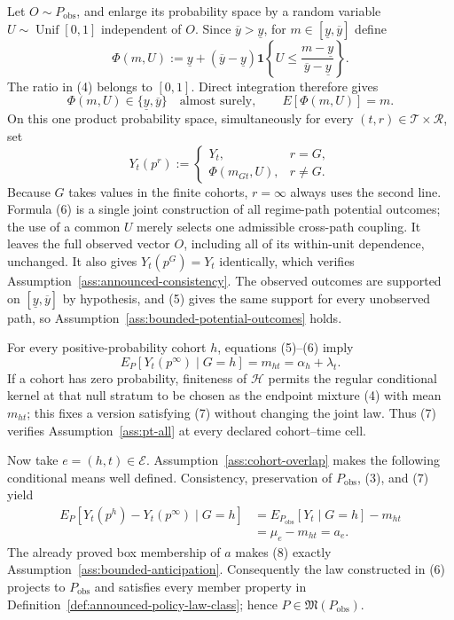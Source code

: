 Let \(O\sim P_{\mathrm{obs}}\), and enlarge its probability space by a random variable \(U\sim\operatorname{Unif}[0,1]\) independent of \(O\).  Since \(\overline y>\underline y\), for \(m\in[\underline y,\overline y]\) define
\[
 \Phi(m,U):=\underline y+(\overline y-\underline y)
 \mathbf 1\!\left\{U\le
 \frac{m-\underline y}{\overline y-\underline y}\right\}.
\tag{4}
\]
The ratio in (4) belongs to \([0,1]\).  Direct integration therefore gives
\[
 \Phi(m,U)\in\{\underline y,\overline y\}
 \quad\text{almost surely},
 \qquad E[\Phi(m,U)]=m.
\tag{5}
\]
On this one product probability space, simultaneously for every \((t,r)\in\mathcal T\times\mathcal R\), set
\[
 Y_t(p^r):=
 \begin{cases}
 Y_t,&r=G,\\
 \Phi(m_{Gt},U),&r\ne G.
 \end{cases}
\tag{6}
\]
Because \(G\) takes values in the finite cohorts, \(r=\infty\) always uses the second line.  Formula (6) is a single joint construction of all regime-path potential outcomes; the use of a common \(U\) merely selects one admissible cross-path coupling.  It leaves the full observed vector \(O\), including all of its within-unit dependence, unchanged.  It also gives \(Y_t(p^G)=Y_t\) identically, which verifies Assumption~\ref{ass:announced-consistency}.  The observed outcomes are supported on \([\underline y,\overline y]\) by hypothesis, and (5) gives the same support for every unobserved path, so Assumption~\ref{ass:bounded-potential-outcomes} holds.

For every positive-probability cohort \(h\), equations (5)--(6) imply
\[
 E_P[Y_t(p^\infty)\mid G=h]=m_{ht}=\alpha_h+\lambda_t.
\tag{7}
\]
If a cohort has zero probability, finiteness of \(\mathcal H\) permits the regular conditional kernel at that null stratum to be chosen as the endpoint mixture (4) with mean \(m_{ht}\); this fixes a version satisfying (7) without changing the joint law.  Thus (7) verifies Assumption~\ref{ass:pt-all} at every declared cohort--time cell.

Now take \(e=(h,t)\in\mathcal E\).  Assumption~\ref{ass:cohort-overlap} makes the following conditional means well defined.  Consistency, preservation of \(P_{\mathrm{obs}}\), (3), and (7) yield
\[
 \begin{aligned}
 E_P[Y_t(p^h)-Y_t(p^\infty)\mid G=h]
 &=E_{P_{\mathrm{obs}}}[Y_t\mid G=h]-m_{ht}\\
 &=\mu_e-m_{ht}=a_e.
 \end{aligned}
\tag{8}
\]
The already proved box membership of \(a\) makes (8) exactly Assumption~\ref{ass:bounded-anticipation}.  Consequently the law constructed in (6) projects to \(P_{\mathrm{obs}}\) and satisfies every member property in Definition~\ref{def:announced-policy-law-class}; hence \(P\in\mathfrak M(P_{\mathrm{obs}})\).

